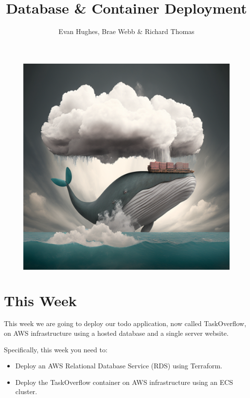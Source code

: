 \documentclass{csse4400}
\title{Database \& Container Deployment}
\author{Evan Hughes, Brae Webb \& Richard Thomas}
\date{\week[practical]{5}}
\begin{document}
\maketitle

\begin{figure}[h]
  \begin{center}
    \includegraphics[scale=0.4]{images/cloud-whale}
  \end{center}
\end{figure}




\section{This Week}
This week we are going to deploy our todo application, now called TaskOverflow,
on AWS infrastructure using a hosted database and a single server website.

Specifically, this week you need to:
\begin{itemize}
    \item Deploy an AWS Relational Database Service (RDS) using Terraform.
    \item Deploy the TaskOverflow container on AWS infrastructure using an ECS cluster.
\end{itemize}
\end{document}
